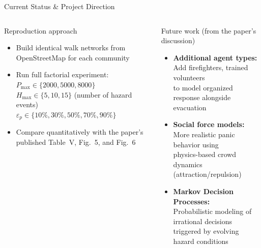 \documentclass[aspectratio=169, xcolor=table]{beamer}
\begin{document}
\begin{frame}[t,shrink=8]{Current Status \& Project Direction}
\begin{columns}[T,onlytextwidth]

\begin{block}{\small Reproduction approach}
\scriptsize
\begin{itemize}\itemsep0.2em
  \item Build identical walk networks from OpenStreetMap for each community
  \item Run full factorial experiment:\\
        $P_{\max} \in \{2000, 5000, 8000\}$\\
        $H_{\max} \in \{5, 10, 15\}$ (number of hazard events)\\
        $\varepsilon_p \in \{10\%, 30\%, 50\%, 70\%, 90\%\}$
  \item Compare quantitatively with the paper's published Table~V, Fig.~5, and Fig.~6
\end{itemize}
\end{block}

\vspace{0.1em}
\begin{alertblock}{\small Future work (from the paper's discussion)}
\scriptsize
\begin{itemize}\itemsep0.2em
  \item \textbf{Additional agent types:}\\
        Add firefighters, trained volunteers\\
        to model organized response alongside evacuation
  \item \textbf{Social force models:}\\
        More realistic panic behavior using\\
        physics-based crowd dynamics (attraction/repulsion)
  \item \textbf{Markov Decision Processes:}\\
        Probabilistic modeling of irrational decisions\\
        triggered by evolving hazard conditions
\end{itemize}
\end{alertblock}

\end{columns}
\end{frame}
\end{document}
